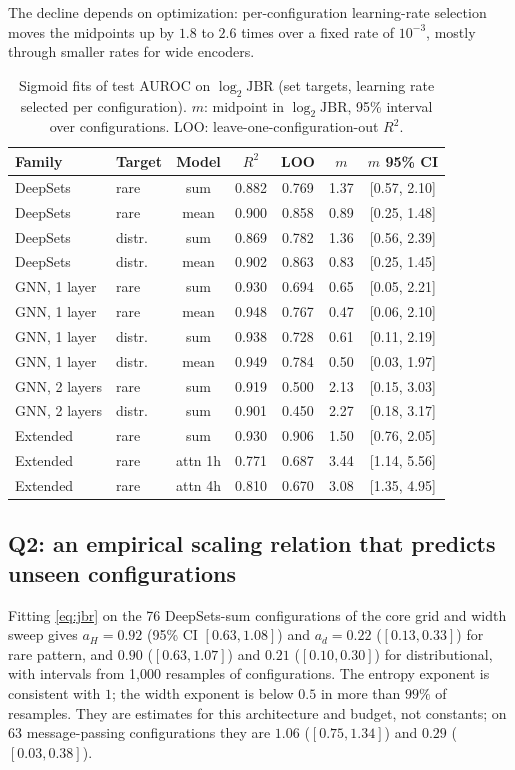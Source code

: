 \documentclass[conference]{IEEEtran}
\newcommand{\jbr}{\mathrm{JBR}}
\begin{document}
The decline depends on optimization: per-configuration learning-rate selection moves the midpoints up by $1.8$ to $2.6$ times over a fixed rate of $10^{-3}$, mostly through smaller rates for wide encoders.

\begin{table}[t]
\caption{Sigmoid fits of test AUROC on $\log_2\jbr$ (set targets, learning rate selected per configuration). $m$: midpoint in $\log_2\jbr$, 95\% interval over configurations. LOO: leave-one-configuration-out $R^2$.}
\label{tab:fits}
\centering
\setlength{\tabcolsep}{2.6pt}
\begin{tabular}{llccccc}
\toprule
Family & Target & Model & $R^2$ & LOO & $m$ & $m$ 95\% CI\\
\midrule
DeepSets & rare & sum & 0.882 & 0.769 & 1.37 & [0.57, 2.10]\\
DeepSets & rare & mean & 0.900 & 0.858 & 0.89 & [0.25, 1.48]\\
DeepSets & distr. & sum & 0.869 & 0.782 & 1.36 & [0.56, 2.39]\\
DeepSets & distr. & mean & 0.902 & 0.863 & 0.83 & [0.25, 1.45]\\
GNN, 1 layer & rare & sum & 0.930 & 0.694 & 0.65 & [0.05, 2.21]\\
GNN, 1 layer & rare & mean & 0.948 & 0.767 & 0.47 & [0.06, 2.10]\\
GNN, 1 layer & distr. & sum & 0.938 & 0.728 & 0.61 & [0.11, 2.19]\\
GNN, 1 layer & distr. & mean & 0.949 & 0.784 & 0.50 & [0.03, 1.97]\\
\midrule
GNN, 2 layers & rare & sum & 0.919 & 0.500 & 2.13 & [0.15, 3.03]\\
GNN, 2 layers & distr. & sum & 0.901 & 0.450 & 2.27 & [0.18, 3.17]\\
Extended & rare & sum & 0.930 & 0.906 & 1.50 & [0.76, 2.05]\\
Extended & rare & attn 1h & 0.771 & 0.687 & 3.44 & [1.14, 5.56]\\
Extended & rare & attn 4h & 0.810 & 0.670 & 3.08 & [1.35, 4.95]\\
\bottomrule
\end{tabular}
\end{table}

\subsection{Q2: an empirical scaling relation that predicts unseen configurations}

Fitting \eqref{eq:jbr} on the 76 DeepSets-sum configurations of the core grid and width sweep gives $a_H = 0.92$ (95\% CI $[0.63, 1.08]$) and $a_d = 0.22$ ($[0.13, 0.33]$) for rare pattern, and $0.90$ ($[0.63, 1.07]$) and $0.21$ ($[0.10, 0.30]$) for distributional, with intervals from 1{,}000 resamples of configurations. The entropy exponent is consistent with $1$; the width exponent is below $0.5$ in more than $99\%$ of resamples. They are estimates for this architecture and budget, not constants; on 63 message-passing configurations they are $1.06$ ($[0.75, 1.34]$) and $0.29$ ($[0.03, 0.38]$).
\end{document}
